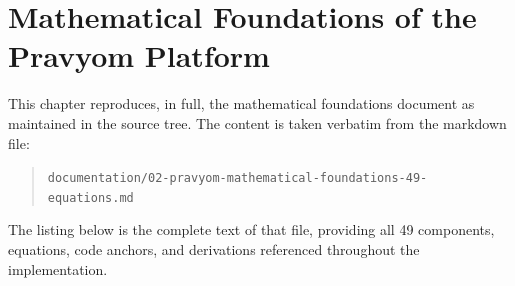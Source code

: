 
\chapter{Mathematical Foundations of the Pravyom Platform}

This chapter reproduces, in full, the mathematical foundations
document as maintained in the source tree. The content is taken
verbatim from the markdown file:

\begin{quote}
\texttt{documentation/02-pravyom-mathematical-foundations-49-equations.md}
\end{quote}

The listing below is the complete text of that file, providing all
49 components, equations, code anchors, and derivations referenced
throughout the implementation.


